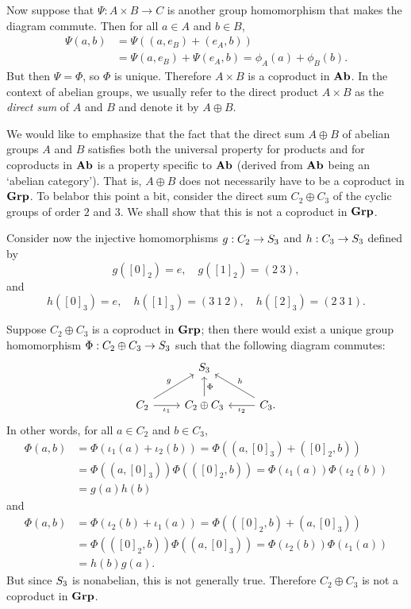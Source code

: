 Now suppose that \(\Psi : A \times B \to C\) is another group homomorphism that
makes the diagram commute. Then for all \(a \in A\) and \(b \in B\),
\begin{align*}
    \Psi(a, b) &= \Psi((a, e_B) + (e_A, b)) \\&= \Psi(a, e_B) + \Psi(e_A, b) = \phi_A(a) + \phi_B(b).
\end{align*}
But then \(\Psi = \Phi\), so \(\Phi\) is unique. Therefore \(A \times B\) is a
coproduct in \(\mathbf{Ab}\). In the context of abelian groups, we usually refer to the
direct product \(A \times B\) as the \emph{direct sum} of \(A\) and \(B\) and
denote it by \(A \oplus B\).

\begin{example}
    We would like to emphasize that the fact that the direct sum \(A \oplus B\)
    of abelian groups \(A\) and \(B\) satisfies both the universal property for
    products and for coproducts in \(\mathbf{Ab}\) is a property specific to \(\mathbf{Ab}\)
    (derived from \(\mathbf{Ab}\) being an `abelian category'). That is, \(A \oplus B\)
    does not necessarily have to be a coproduct in \(\mathbf{Grp}\). To belabor this
    point a bit, consider the direct sum \(C_2 \oplus C_3\) of the cyclic groups
    of order \(2\) and \(3\). We shall show that this is not a coproduct in
    \(\mathbf{Grp}\).

    Consider now the injective homomorphisms \(g: C_2 \to S_{3}\) and \(h:
    C_3 \to S_{3}\) defined by
    \[
        g([0]_2) = e, \quad g([1]_2) = (2\ 3),
    \]
    and
    \[
        h([0]_3) = e, \quad h([1]_3) = (3\ 1\ 2), \quad h([2]_3) = (2\ 3\ 1).
    \]

    Suppose \(C_2 \oplus C_3\) is a coproduct in \(\mathbf{Grp}\); then there would
    exist a unique group homomorphism \(\Phi: C_2 \oplus C_3 \to S_{3}\) such
    that the following diagram commutes:
    \[
        \begin{tikzcd}
            & \Symx{3} & \\
            C_2 \arrow[ur, "g"] \arrow[r, "\iota_1"'] & C_2 \oplus C_3 \arrow[u, "\Phi"'] & C_3 \arrow[ul, "h"'] \arrow[l, "\iota_2"].
        \end{tikzcd}
    \]
    In other words, for all \(a \in C_2\) and \(b \in C_3\),
    \begin{align*}
        \Phi(a,b) &= \Phi(\iota_1(a) + \iota_2(b)) = \Phi((a, [0]_3) + ([0]_2, b))\\
        &= \Phi((a, [0]_3)) \Phi(([0]_2, b)) = \Phi(\iota_1(a))\Phi(\iota_2(b)) \\&= g(a)h(b)
    \end{align*}
    and
    \begin{align*}
        \Phi(a, b) &= \Phi(\iota_2(b) + \iota_1(a)) = \Phi(([0]_2, b) + (a, [0]_3))\\
        &= \Phi(([0]_2, b))\Phi((a, [0]_3)) = \Phi(\iota_2(b))\Phi(\iota_1(a)) \\&= h(b)g(a).
    \end{align*}
    But since \(S_{3}\) is nonabelian, this is not generally true. Therefore
    \(C_2 \oplus C_3\) is not a coproduct in \(\mathbf{Grp}\).
\end{example}

